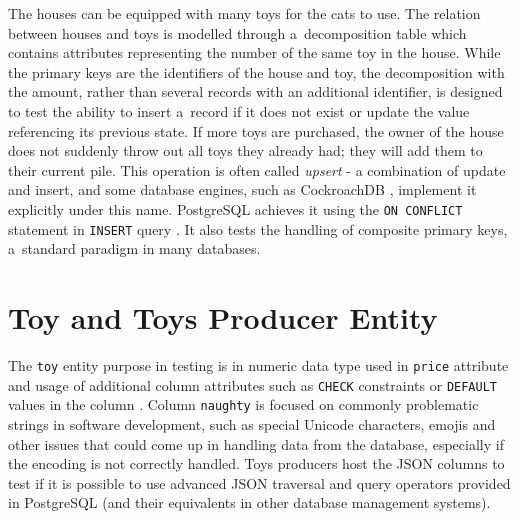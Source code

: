 The houses can be equipped with many toys for the cats to use. The relation
between houses and toys is modelled through a~decomposition table which contains
attributes representing the number of the same toy in the house. While the
primary keys are the identifiers of the house and toy, the decomposition with
the amount, rather than several records with an additional identifier, is
designed to test the ability to insert a~record if it does not exist or update
the value referencing its previous state. If more toys are purchased, the owner
of the house does not suddenly throw out all toys they already had; they will
add them to their current pile. This operation is often called \textit{upsert} -
a combination of update and insert, and some database engines, such as
CockroachDB \cite{upsertCockroachDB}, implement it explicitly under this name.
PostgreSQL achieves it using the \texttt{ON CONFLICT} statement in
\texttt{INSERT} query \cite{INSERT_postgres_2023}. It also tests the handling of
composite primary keys, a~standard paradigm in many databases.

\section{Toy and Toys Producer Entity}
The \texttt{toy} entity purpose in testing is in numeric data type used in
\texttt{price} attribute and usage of additional column attributes such as
\texttt{CHECK} constraints or \texttt{DEFAULT} values in the column
\cite{Constraints_Postgres_2023}. Column \texttt{naughty} is focused on commonly
problematic strings in software development, such as special Unicode characters,
emojis and other issues that could come up in handling data from the database,
especially if the encoding is not correctly handled. Toys producers host the
JSON columns to test if it is possible to use advanced JSON traversal and query
operators provided in PostgreSQL \cite{postgres-json} (and their equivalents in
other database management systems).
